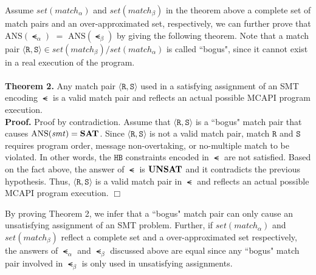 Assume $\mathit{set(match_{\alpha})}$ and $\mathit{set(match_{\beta})}$ in the theorem above a complete set of match pairs and an over-approximated set, respectively, we can further prove that $\mathrm{ANS}(\smt_{\alpha})$ $ = $ $\mathrm{ANS}(\smt_{\beta})$ by giving the following theorem. Note that a match pair $\langle \mathtt{R},\mathtt{S}\rangle \in \mathit{set(match_{\beta})}/\mathit{set(match_{\alpha})}$ is called ``bogus", since it cannot exist in a real execution of the program.
\\
\\
\textbf{Theorem 2.}
Any match pair $\langle \mathtt{R}, \mathtt{S}\rangle$ used in a satisfying assignment of an SMT encoding $\smt$ is a valid match pair and reflects an actual possible MCAPI program execution.
\\
\textbf{Proof.}
Proof by contradiction. Assume that $\langle \mathtt{R}, \mathtt{S}\rangle$ is a ``bogus" match pair that causes $\mathrm{ANS}(\mathit{smt}) = \textbf{SAT}$. Since $\langle \mathtt{R}, \mathtt{S}\rangle$ is not a valid match pair, match $\mathtt{R}$ and $\mathtt{S}$ requires program order, message non-overtaking, or no-multiple match to be violated. In other words, the $\mathtt{HB}$ constraints encoded in $\smt$ are not satisfied. Based on the fact above, the answer of $\smt$ is $\textbf{UNSAT}$ and it contradicts the previous hypothesis. Thus, $\langle \mathtt{R}, \mathtt{S}\rangle$ is a valid match pair in $\smt$ and reflects an actual possible MCAPI program execution. $\Box$


By proving Theorem 2, we infer that a ``bogus" match pair can only cause an unsatisfying assignment of an SMT problem. Further, if $\mathit{set(match_{\alpha})}$ and $\mathit{set(match_{\beta})}$ reflect a complete set and a over-approximated set respectively, the answers of $\smt_{\alpha}$ and $\smt_{\beta}$ discussed above are equal since any ``bogus" match pair involved in $\smt_{\beta}$ is only used in unsatisfying assignments.











